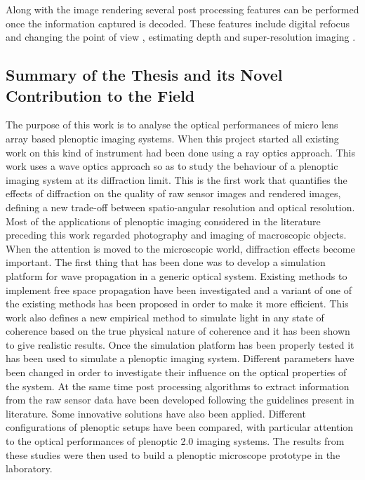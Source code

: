 Along with the image rendering several post processing features can be performed once the information captured is decoded. These features include digital refocus and changing the point of view \cite{ng2006digital}, estimating depth \cite{ji2015depth,wetzstein2011computational,georgiev2012multifocus,georgiev2006light} and super-resolution imaging \cite{bishop2009light,shroff2013image,georgiev2009superresolution,georgiev2015plenoptic}. \\
\subsection*{Summary of the Thesis and its Novel Contribution to the Field}
The purpose of this work is to analyse the optical performances of micro lens array based plenoptic imaging systems. When this project started all existing work on this kind of instrument had been done using a ray optics approach. This work uses a wave optics approach so as to study the behaviour of a plenoptic imaging system at its diffraction limit. This is the first work that quantifies the effects of diffraction on the quality of raw sensor images and rendered images, defining a new trade-off between spatio-angular resolution and optical resolution. Most of the applications of plenoptic imaging considered in the literature preceding this work regarded photography and imaging of macroscopic objects. When the attention is moved to the microscopic world, diffraction effects become important. The first thing that has been done was to develop a simulation platform for wave propagation in a generic optical system. Existing methods to implement free space propagation have been investigated and a variant of one of the existing methods has been proposed in order to make it more efficient. This work also defines a new empirical method to simulate light in any state of coherence based on the true physical nature of coherence and it has been shown to give realistic results. Once the simulation platform has been properly tested it has been used to simulate a plenoptic imaging system. Different parameters have been changed in order to investigate their influence on the optical properties of the system. At the same time post processing algorithms to extract information from the raw sensor data have been developed following the guidelines present in literature. Some innovative solutions have also been applied. Different configurations of plenoptic setups have been compared, with particular attention to the optical performances of plenoptic 2.0 imaging systems. The results from these studies were then used to build a plenoptic microscope prototype in the laboratory.
